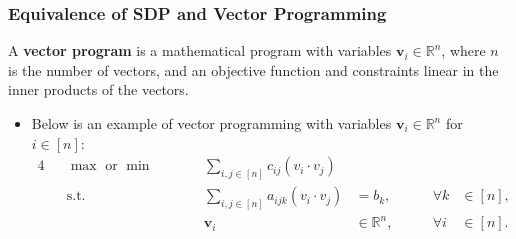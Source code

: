 \documentclass{beamer}
\newcommand{\RR}{\mathbb{R}}
\begin{document}
    \begin{frame}
        \frametitle{Equivalence of SDP and Vector Programming}
    
        \begin{definition}
            A {\bf vector program} is a mathematical program with variables $\mathbf v_i \in \RR^n$, where $n$ is the number of vectors, and an objective function and constraints linear in the inner products of the vectors.
        \end{definition}

        \pause

        \begin{itemize}
            \item Below is an example of vector programming with variables $\mathbf v_i \in \RR^n$ for $i \in [n]$:
            \begin{alignat}{4}
                && \max \text{ or } \min \qquad && \sum_{i, j \in [n]} c_{ij} \left(v_i \cdot v_j\right) \label{example:vector-program} \\
                && \text{s.t.} \qquad && \sum_{i, j \in [n]} a_{ijk} \left(v_i \cdot v_j\right) &= b_k, & \qquad \forall k & \in [n], \nonumber \\
                && && \mathbf v_i &\in \RR^n, & \qquad \forall i & \in [n]. \nonumber
              \end{alignat}
        \end{itemize}
    \end{frame}
\end{document}
